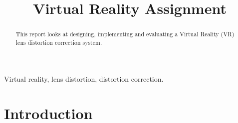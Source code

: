 \documentclass[conference]{IEEEtran}
\begin{document}
    \title{Virtual Reality Assignment}

    \author{
    }

    \maketitle
    
    \begin{abstract}
        This report looks at designing, implementing and evaluating a Virtual Reality (VR) lens distortion correction system.
    \end{abstract}
    
    \begin{IEEEkeywords}
        Virtual reality, lens distortion, distortion correction.
    \end{IEEEkeywords}

    \section{Introduction}\label{sec:introduction}
    

    ~\cite{brown1966decentering}

    
    
    \vspace{12pt}
    \color{red}
\end{document}
